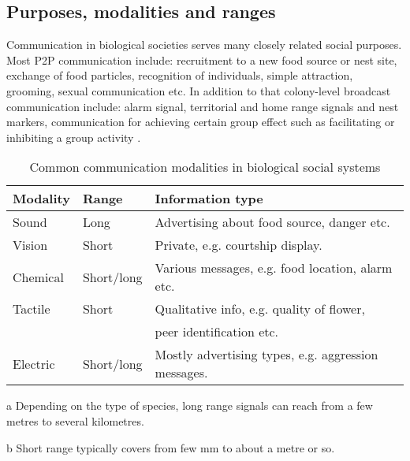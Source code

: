 \subsection{Purposes, modalities and ranges}
Communication in biological societies serves many closely related social purposes. Most P2P communication include: recruitment to a new food source or nest site, exchange of food particles, recognition of individuals, simple attraction, grooming, sexual communication etc. In addition to that colony-level broadcast communication include: alarm signal, territorial and home range signals and nest markers, communication for achieving certain group effect such as facilitating or inhibiting  a group activity \cite{Holldobler1990}.
\begin{table}
\caption{Common communication modalities in biological social systems}
\label{table:bio-comm-modalities}
\begin{center}
\begin{threeparttable}
\begin{tabular}{|l|l|l|}
\hline \textbf{Modality} & \textbf{Range} & \textbf{Information type}\\
\hline Sound & Long\tnote{a} & Advertising about food  source,  danger etc. \\                                                                                                                                               
\hline Vision & Short\tnote{b}  & Private, e.g. courtship display. \\
\hline Chemical  & Short/long & Various messages, e.g. food location, alarm etc.\\
\hline Tactile & Short & Qualitative info, e.g. quality of flower,\\ & & peer identification etc.\\
\hline Electric & Short/long & Mostly advertising types, e.g. aggression messages.\\
\hline
\end{tabular}
\begin{tablenotes}
\item [a]Depending on the type of species, long range signals can reach from a few metres to several kilometres.
\item [b]Short range typically covers from few mm to about a metre or so.
\end{tablenotes}
\end{threeparttable}
\end{center}
\end{table}

